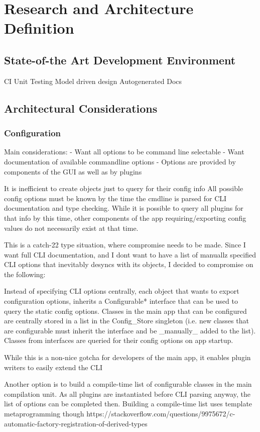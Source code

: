 \chapter{Research and Architecture Definition}

\section{State-of-the Art Development Environment}
CI
Unit Testing
Model driven design
Autogenerated Docs
\section{Architectural Considerations}
\subsection{Configuration}
Main considerations:
- Want all options to be command line selectable
- Want documentation of available commandline options
- Options are provided by components of the GUI as well as by plugins

It is inefficient to create objects just to query for their config info
All possible config options must be known by the time the cmdline is parsed for CLI documentation and type checking. While it is possible to query all plugins for that info by this time, other components of the app requiring/exporting config values do not necessarily exist at that time.

This is a catch-22 type situation, where compromise needs to be made. Since I want full CLI documentation, and I dont want to have a list of manuallz specified CLI options that inevitably desyncs with its objects, I decided to compromise on the following:

Instead of specifying CLI options centrally, each object that wants to export configuration options, inherits a Configurable* interface that can be used to query the static config options.
Classes in the main app that can be configured are centrally stored in a list in the Config_Store singleton (i.e. new classes that are configurable must inherit the interface and be _manually_ added to the list).
Classes from interfaces are queried for their config options on app startup.

While this is a non-nice gotcha for developers of the main app, it enables plugin writers to easily extend the CLI


Another option is to build a compile-time list of configurable classes in the main compilation unit. As all plugins are instantiated before CLI parsing anyway, the list of options can be completed then.
Building a compile-time list uses template metaprogramming though
	https://stackoverflow.com/questions/9975672/c-automatic-factory-registration-of-derived-types

